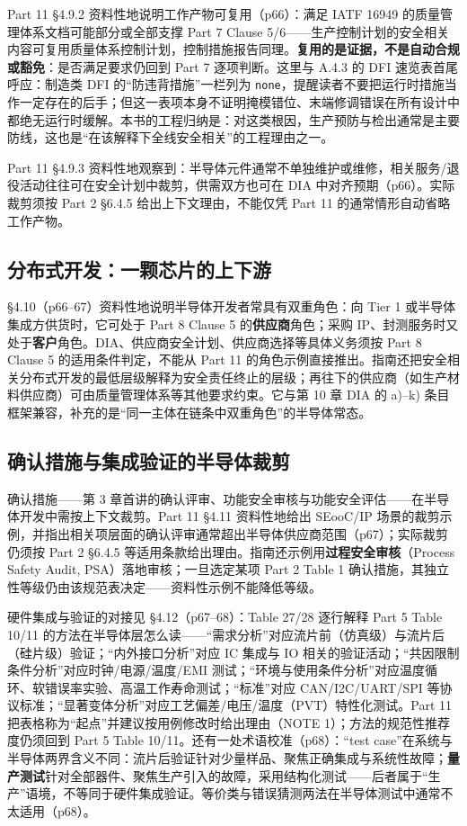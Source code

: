 Part 11 §4.9.2 资料性地说明工作产物可复用（p66）：满足 IATF 16949 的质量管理体系文档可能部分或全部支撑 Part 7 Clause 5/6——生产控制计划的安全相关内容可复用质量体系控制计划，控制措施报告同理。\textbf{复用的是证据，不是自动合规或豁免}：是否满足要求仍回到 Part 7 逐项判断。这里与 A.4.3 的 DFI 速览表首尾呼应：制造类 DFI 的“防违背措施”一栏列为 \nolinkurl{none}，提醒读者不要把运行时措施当作一定存在的后手；但这一表项本身不证明掩模错位、末端修调错误在所有设计中都绝无运行时缓解。本书的工程归纳是：对这类根因，生产预防与检出通常是主要防线，这也是“在该解释下全线安全相关”的工程理由之一。

Part 11 §4.9.3 资料性地观察到：半导体元件通常不单独维护或维修，相关服务/退役活动往往可在安全计划中裁剪，供需双方也可在 DIA 中对齐预期（p66）。实际裁剪须按 Part 2 §6.4.5 给出上下文理由，不能仅凭 Part 11 的通常情形自动省略工作产物。

\subsection{分布式开发：一颗芯片的上下游}

§4.10（p66–67）资料性地说明半导体开发者常具有双重角色：向 Tier 1 或半导体集成方供货时，它可处于 Part 8 Clause 5 的\textbf{供应商}角色；采购 IP、封测服务时又处于\textbf{客户}角色。DIA、供应商安全计划、供应商选择等具体义务须按 Part 8 Clause 5 的适用条件判定，不能从 Part 11 的角色示例直接推出。指南还把安全相关分布式开发的最低层级解释为安全责任终止的层级；再往下的供应商（如生产材料供应商）可由质量管理体系等其他要求约束。它与第 10 章 DIA 的 a)–k) 条目框架兼容，补充的是“同一主体在链条中双重角色”的半导体常态。

\subsection{确认措施与集成验证的半导体裁剪}

确认措施——第 3 章首讲的确认评审、功能安全审核与功能安全评估——在半导体开发中需按上下文裁剪。Part 11 §4.11 资料性地给出 SEooC/IP 场景的裁剪示例，并指出相关项层面的确认评审通常超出半导体供应商范围（p67）；实际裁剪仍须按 Part 2 §6.4.5 等适用条款给出理由。指南还示例用\textbf{过程安全审核}（Process Safety Audit, PSA）落地审核；一旦选定某项 Part 2 Table 1 确认措施，其独立性等级仍由该规范表决定——资料性示例不能降低等级。

硬件集成与验证的对接见 §4.12（p67–68）：Table 27/28 逐行解释 Part 5 Table 10/11 的方法在半导体层怎么读——“需求分析”对应流片前（仿真级）与流片后（硅片级）验证；“内外接口分析”对应 IC 集成与 IO 相关的验证活动；“共因限制条件分析”对应时钟/电源/温度/EMI 测试；“环境与使用条件分析”对应温度循环、软错误率实验、高温工作寿命测试；“标准”对应 CAN/I2C/UART/SPI 等协议标准；“显著变体分析”对应工艺偏差/电压/温度（PVT）特性化测试。Part 11 把表格称为“起点”并建议按用例修改时给出理由（NOTE 1）；方法的规范性推荐度仍须回到 Part 5 Table 10/11。还有一处术语校准（p68）：“test case”在系统与半导体两界含义不同：流片后验证针对少量样品、聚焦正确集成与系统性故障；\textbf{量产测试}针对全部器件、聚焦生产引入的故障，采用结构化测试——后者属于“生产”语境，不等同于硬件集成验证。等价类与错误猜测两法在半导体测试中通常不太适用（p68）。

